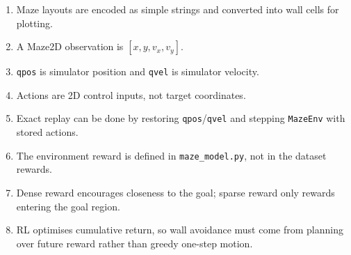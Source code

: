 \documentclass[12pt]{article}
\begin{document}
\begin{enumerate}[leftmargin=*]
\item Maze layouts are encoded as simple strings and converted into wall cells for plotting.
\item A Maze2D observation is \([x,y,v_x,v_y]\).
\item \texttt{qpos} is simulator position and \texttt{qvel} is simulator velocity.
\item Actions are 2D control inputs, not target coordinates.
\item Exact replay can be done by restoring \texttt{qpos}/\texttt{qvel} and stepping \texttt{MazeEnv} with stored actions.
\item The environment reward is defined in \texttt{maze\_model.py}, not in the dataset rewards.
\item Dense reward encourages closeness to the goal; sparse reward only rewards entering the goal region.
\item RL optimises cumulative return, so wall avoidance must come from planning over future reward rather than greedy one-step motion.
\end{enumerate}
\end{document}
